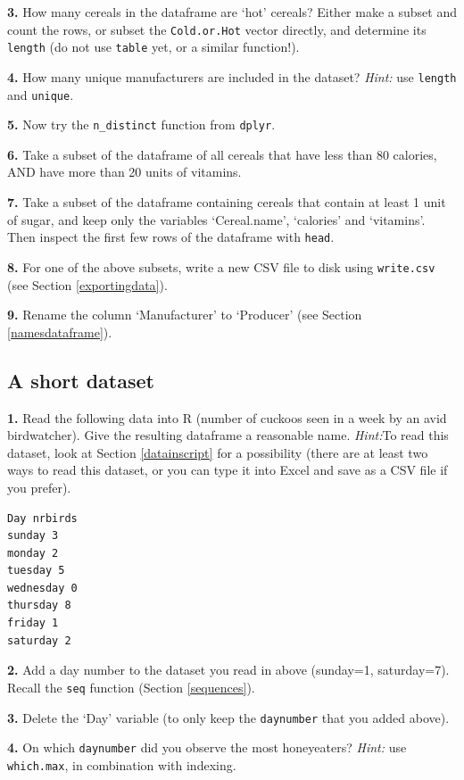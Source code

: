 \documentclass[]{book}
\begin{document}
\textbf{3.} How many cereals in the dataframe are `hot' cereals? Either make a subset and count the rows, or subset the \texttt{Cold.or.Hot} vector directly, and determine its \texttt{length} (do not use \texttt{table} yet, or a similar function!).

\textbf{4.} How many unique manufacturers are included in the dataset? \emph{Hint:} use \texttt{length} and \texttt{unique}.

\textbf{5.} Now try the \texttt{n\_distinct} function from \texttt{dplyr}.

\textbf{6.} Take a subset of the dataframe of all cereals that have less than 80 calories,
AND have more than 20 units of vitamins.

\textbf{7.} Take a subset of the dataframe containing cereals that contain at least 1 unit of sugar, and keep only the variables `Cereal.name', `calories' and `vitamins'. Then inspect the first few rows of the dataframe with \texttt{head}.

\textbf{8.} For one of the above subsets, write a new CSV file to disk using \texttt{write.csv} (see Section \ref{exportingdata}).

\textbf{9.} Rename the column `Manufacturer' to `Producer' (see Section \ref{namesdataframe}).

\hypertarget{a-short-dataset}{%
\subsection{A short dataset}\label{a-short-dataset}}

\textbf{1.} Read the following data into R (number of cuckoos seen in a week by an avid birdwatcher). Give the resulting dataframe a reasonable name. \emph{Hint:}To read this dataset, look at Section \ref{datainscript} for a possibility (there are at least two ways to read this dataset, or you can type it into Excel and save as a CSV file if you prefer).

\begin{verbatim}
Day nrbirds
sunday 3
monday 2
tuesday 5
wednesday 0
thursday 8
friday 1
saturday 2
\end{verbatim}

\textbf{2.} Add a day number to the dataset you read in above (sunday=1, saturday=7). Recall the \texttt{seq} function (Section \ref{sequences}).

\textbf{3.} Delete the `Day' variable (to only keep the \texttt{daynumber} that you added above).

\textbf{4.} On which \texttt{daynumber} did you observe the most honeyeaters? \emph{Hint:} use \texttt{which.max}, in combination with indexing.
\end{document}

